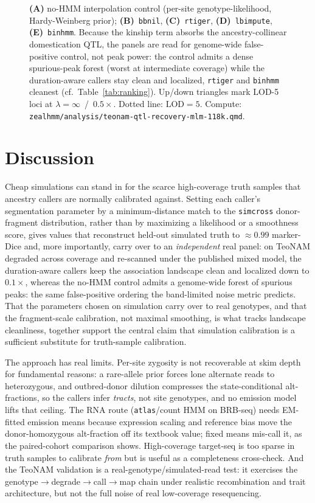 \documentclass[9pt,twocolumn,twoside]{rilabRxiv}
\newcommand{\bbnil}{\texttt{bbnil}\xspace}
\newcommand{\rtiger}{\texttt{rtiger}\xspace}
\newcommand{\atlas}{\texttt{atlas}\xspace}
\newcommand{\binhmm}{\texttt{binhmm}\xspace}
\newcommand{\lbimpute}{\texttt{lbimpute}\xspace}
\begin{document}
\begin{figure}[t!]
\ContinuedFloat
\caption{\textbf{(A)} no-HMM interpolation control (per-site genotype-likelihood,
Hardy-Weinberg prior); \textbf{(B)}~\bbnil, \textbf{(C)}~\rtiger, \textbf{(D)}~\lbimpute,
\textbf{(E)}~\binhmm. Because the kinship term absorbs the ancestry-collinear
domestication QTL, the panels are read for genome-wide false-positive control, not peak
power: the control admits a dense spurious-peak forest (worst at intermediate coverage)
while the duration-aware callers stay clean and localized, \rtiger and \binhmm cleanest
(cf.\ Table~\ref{tab:ranking}). Up/down triangles mark $\mathrm{LOD}$-5 loci at
$\lambda=\infty$~/~$0.5\times$. Dotted line: $\mathrm{LOD}=5$. Compute:
\texttt{zealhmm/analysis/teonam-qtl-recovery-mlm-118k.qmd}.}
\end{figure}


\section{Discussion}
Cheap simulations can stand in for the scarce high-coverage truth samples that
ancestry callers are normally calibrated against. Setting each caller's segmentation
parameter by a minimum-distance match to the \texttt{simcross} donor-fragment
distribution, rather than by maximizing a likelihood or a smoothness score, gives
values that reconstruct held-out simulated truth to ${\approx}0.99$ marker-Dice and,
more importantly, carry over to an \emph{independent} real panel: on TeoNAM degraded
across coverage and re-scanned under the published mixed model, the duration-aware
callers keep the association landscape clean and localized down to $0.1\times$, whereas
the no-HMM control admits a genome-wide forest of spurious peaks: the same
false-positive ordering the band-limited noise metric predicts. That the parameters
chosen on simulation carry over to real genotypes, and that the fragment-scale
calibration, not maximal smoothing, is what tracks landscape cleanliness, together
support the central claim that simulation calibration is a sufficient substitute for
truth-sample calibration.

The approach has real limits. Per-site zygosity is not recoverable at skim depth for
fundamental reasons: a rare-allele prior forces lone alternate reads to
heterozygous, and outbred-donor dilution compresses the state-conditional alt-fractions,
so the callers infer \emph{tracts}, not site genotypes, and no emission model lifts
that ceiling. The RNA route (\atlas/count HMM on BRB-seq) needs EM-fitted emission means
because expression scaling and reference bias move the donor-homozygous alt-fraction off
its textbook value; fixed means mis-call it, as the paired-cohort comparison shows.
High-coverage target-seq is too sparse in truth samples to calibrate \emph{from} but is
useful as a completeness cross-check. And the TeoNAM validation is a
real-genotype/simulated-read test: it exercises the genotype$\rightarrow$degrade$
\rightarrow$call$\rightarrow$map chain under realistic recombination and trait
architecture, but not the full noise of real low-coverage resequencing.
\end{document}
